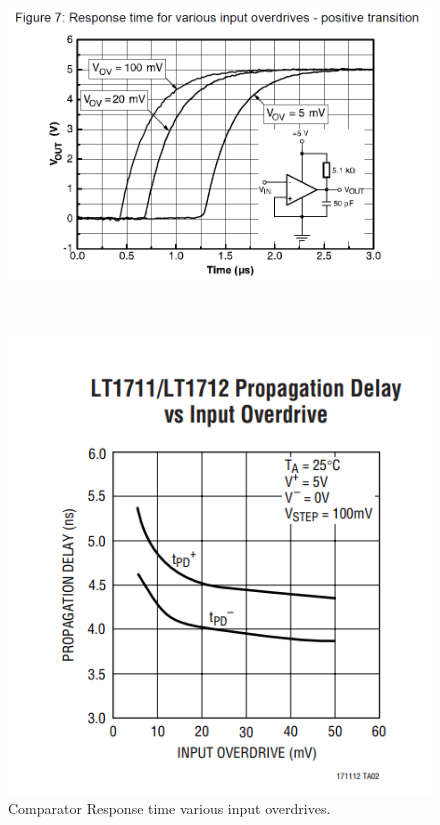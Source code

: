 \begin{figure}
\begin{minipage}{0.32\textwidth}
    \centering
    \includegraphics[width=\textwidth]{Figure/section3/copd/copd1.png}
    \caption{ \label{fig:copd1} Comparator Response time various input overdrives.}
\end{minipage}
~
\begin{minipage}{0.32\textwidth}
    \centering
    \includegraphics[width=\textwidth]{Figure/section3/copd/copd2.png}

\end{minipage}
\end{figure}
